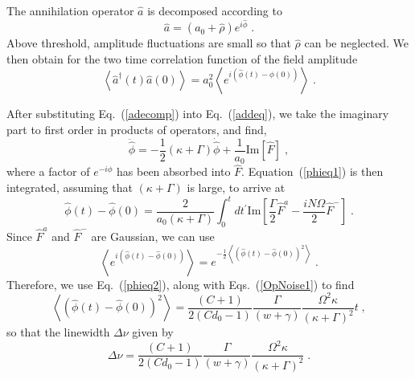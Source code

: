 \documentclass[aps,
twocolumn,
showpacs,
superscriptaddress,groupedaddress]{revtex4}
\begin{document}
The annihilation operator $\hat{a}$ is decomposed according to
\begin{equation}
\hat{a}= (a_0 + \hat{\rho}) e^{i\hat{\phi}}\;.
\label{adecomp}
\end{equation}
Above threshold, amplitude fluctuations are small so that $\hat\rho$
can be neglected.  We then obtain for the two time correlation function
of the field amplitude
\begin{equation}
\left< \hat{a}^{\dagger}(t) \hat{a}(0) \right> =
a_0^2 \left< e^{i(\hat{\phi}(t) - \hat{\phi}(0))} \right>\;.
\end{equation}

After substituting Eq.~(\ref{adecomp}) into Eq.~(\ref{addeq}), we take
the imaginary part to first order in products of operators, and find,
\begin{equation}
\ddot{\hat{\phi}} =
-\frac{1}{2}(\kappa+\Gamma) \dot{\hat{\phi}} +
\frac{1}{a_0} \text{Im} [\hat{F}]\;,
\label{phieq1}
\end{equation}
where a factor of $e^{-i\phi}$ has been absorbed into $\hat{F}$.
Equation~(\ref{phieq1}) is then integrated, assuming that
$(\kappa+\Gamma)$ is large, to arrive at
\begin{equation}
\hat{\phi}(t) - \hat{\phi}(0) =
\frac{2}{a_0 (\kappa+\Gamma)}
\int_0^t dt^{\prime} \text{Im}
\left[ \frac{\Gamma}{2} \hat{F}^a-\frac{i N \Omega}{2} \hat{F}^-\right]\;.
\label{phieq2}
\end{equation}
Since $ \hat{F}^a$ and $\hat{F}^-$ are Gaussian, we can use
\begin{equation}
\left< e^{i(\hat{\phi}(t) - \hat{\phi}(0))} \right> =
e^{-\frac{1}{2}\left< {( \hat{\phi}(t) - \hat{\phi}(0) )}^2 \right>}\;.
\end{equation}
Therefore, we use Eq.~(\ref{phieq2}), along with Eqs.~(\ref{OpNoise1})
to find
\begin{equation}
\left<{(\hat{\phi}(t) - \hat{\phi}(0))}^2 \right> =
\frac{(C+1)}{2(Cd_0-1)} \frac{\Gamma}{(w+\gamma)}
\frac{\Omega^2 \kappa}{{(\kappa+\Gamma)}^2} t\;,
\end{equation}
so that the linewidth $\Delta \nu$ given by
\begin{equation}
\Delta \nu =
\frac{(C+1)}{2(Cd_0-1)} \frac{\Gamma}{(w+\gamma)}
\frac{\Omega^2 \kappa}{{(\kappa+\Gamma)}^2}\;.
\label{LWHaken}
\end{equation}


\end{document}
